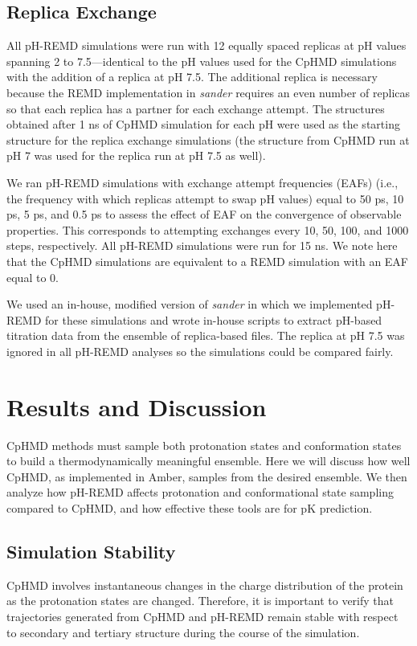 \subsection{Replica Exchange}

All pH-REMD simulations were run with 12 equally spaced replicas at pH values
spanning 2 to 7.5---identical to the pH values used for the CpHMD simulations
with the addition of a replica at pH 7.5. The additional replica is necessary
because the REMD implementation in \emph{sander} requires an even number of
replicas so that each replica has a partner for each exchange attempt. The
structures obtained after 1 ns of CpHMD simulation for each pH were used as the
starting structure for the replica exchange simulations (the structure from
CpHMD run at pH 7 was used for the replica run at pH 7.5 as well).

We ran pH-REMD simulations with exchange attempt frequencies (EAFs) (i.e., the
frequency with which replicas attempt to swap pH values) equal to 50
ps, 10 ps, 5 ps, and 0.5 ps to assess
the effect of EAF on the convergence of observable properties. This corresponds
to attempting exchanges every 10, 50, 100, and 1000 steps, respectively. All
pH-REMD simulations were run for 15 ns. We note here that the CpHMD simulations
are equivalent to a REMD simulation with an EAF equal to 0.

We used an in-house, modified version of \emph{sander} in which we implemented
pH-REMD for these simulations and wrote in-house scripts to extract pH-based
titration data from the ensemble of replica-based files. The replica at pH 7.5
was ignored in all pH-REMD analyses so the simulations could be compared fairly.

\section{Results and Discussion}

CpHMD methods must sample both protonation states and conformation states to
build a thermodynamically meaningful ensemble. Here we will discuss how well
CpHMD, as implemented in Amber, \cite{Mongan_JComputChem_2004_v25_p2038} samples
from the desired ensemble. We then analyze how pH-REMD affects protonation and
conformational state sampling compared to CpHMD, and how effective these tools
are for pK prediction.

\subsection{Simulation Stability}
CpHMD involves instantaneous changes in the charge distribution of the protein
as the protonation states are changed. Therefore, it is important to verify
that trajectories generated from CpHMD and pH-REMD remain stable with respect to
secondary and tertiary structure during the course of the simulation.


